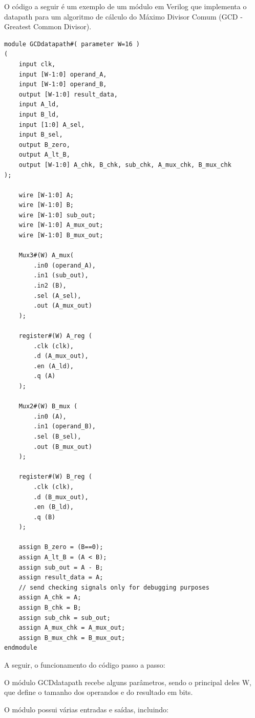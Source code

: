 \documentclass[a4paper,11pt]{article} %
\begin{document}
O código a seguir é um exemplo de um módulo em Verilog 
que implementa o datapath para um algoritmo de cálculo do 
Máximo Divisor Comum (GCD - Greatest Common Divisor). 

\begin{verbatim}
module GCDdatapath#( parameter W=16 )
(
    input clk,
    input [W-1:0] operand_A,
    input [W-1:0] operand_B,
    output [W-1:0] result_data,
    input A_ld,
    input B_ld,
    input [1:0] A_sel,
    input B_sel,
    output B_zero,
    output A_lt_B,
    output [W-1:0] A_chk, B_chk, sub_chk, A_mux_chk, B_mux_chk
);

    wire [W-1:0] A;
    wire [W-1:0] B;
    wire [W-1:0] sub_out;
    wire [W-1:0] A_mux_out;
    wire [W-1:0] B_mux_out;

    Mux3#(W) A_mux(
        .in0 (operand_A),
        .in1 (sub_out),
        .in2 (B),
        .sel (A_sel),
        .out (A_mux_out) 
    );

    register#(W) A_reg (
        .clk (clk),
        .d (A_mux_out),
        .en (A_ld),
        .q (A) 
    );

    Mux2#(W) B_mux (
        .in0 (A),
        .in1 (operand_B),
        .sel (B_sel),
        .out (B_mux_out) 
    );

    register#(W) B_reg (
        .clk (clk),
        .d (B_mux_out),
        .en (B_ld),
        .q (B) 
    );

    assign B_zero = (B==0);
    assign A_lt_B = (A < B);
    assign sub_out = A - B;
    assign result_data = A;
    // send checking signals only for debugging purposes
    assign A_chk = A;
    assign B_chk = B;
    assign sub_chk = sub_out;
    assign A_mux_chk = A_mux_out;
    assign B_mux_chk = B_mux_out;
endmodule
\end{verbatim}


A seguir, o funcionamento do código passo a passo:

O módulo GCDdatapath recebe alguns parâmetros, 
sendo o principal deles W, 
que define o tamanho dos operandos e do resultado em bits.

O módulo possui várias entradas e saídas, incluindo:
\end{document}
